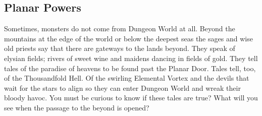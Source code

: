  
\subsection{Planar Powers}    
 

Sometimes, monsters do not come from Dungeon World at all. Beyond the mountains at the edge of the world or below the deepest seas the sages and wise old priests say that there are gateways to the lands beyond. They speak of elysian fields; rivers of sweet wine and maidens dancing in fields of gold. They tell tales of the paradise of heavens to be found past the Planar Door. Tales tell, too, of the Thousandfold Hell. Of the swirling Elemental Vortex and the devils that wait for the stars to align so they can enter Dungeon World and wreak their bloody havoc. You must be curious to know if these tales are true? What will you see when the passage to the beyond is opened?

 

 




